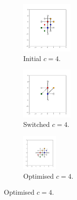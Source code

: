 \begin{figure}[bt]
     \vspace{5mm}
     \begin{subfigure}[b]{0.25\textwidth}
         \centering
         \includegraphics[height=2.6cm]{./figures/general_networks/bs_move_d.pdf}
         \caption{Initial $c=4$.}
         \label{fig:bsmoved}
     \end{subfigure}
     \hfill
     \begin{subfigure}[b]{0.25\textwidth}
         \centering
         \includegraphics[height=2.6cm]{./figures/general_networks/bs_move_e.pdf}
         \caption{Switched $c=4$.}
         \label{fig:bsmovee}
     \end{subfigure}
     \hfill
     \begin{subfigure}[b]{0.25\textwidth}
         \centering
         \includegraphics[height=1.8cm]{./figures/general_networks/bs_move_f.pdf}
         \caption{Optimised $c=4$.}
         \label{fig:bsmovef}
     \end{subfigure}
     

\end{figure}
